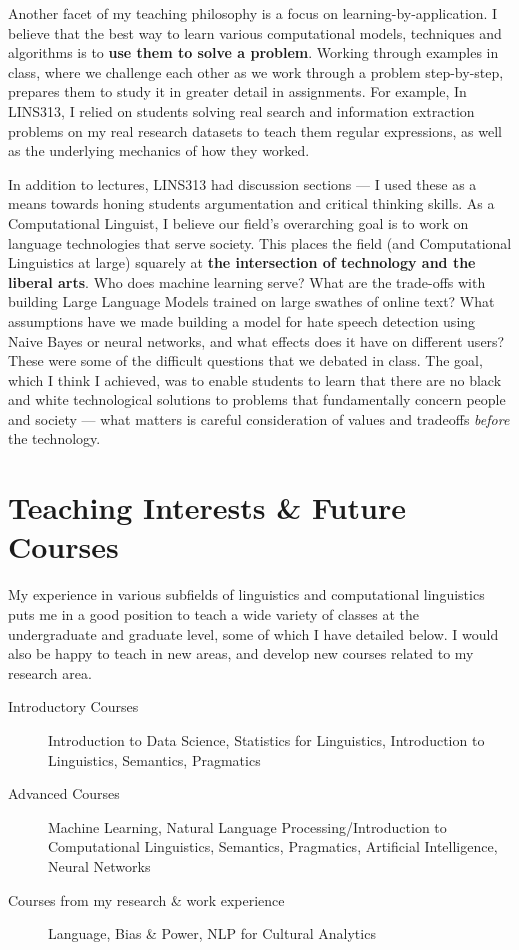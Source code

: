 \documentclass[11pt, letterpaper]{practical-report}
\begin{document}
Another facet of my teaching philosophy is a focus on learning-by-application. I believe that the best way to learn various computational models, techniques and algorithms is to \textbf{use them to solve a problem}. Working through examples in class, where we challenge each other as we work through a problem step-by-step, prepares them to study it in greater detail in assignments. For example, In {\rmcs LINS313}, I relied on students solving real search and information extraction problems on my real research datasets to teach them regular expressions, as well as the underlying mechanics of how they worked.

In addition to lectures, {\rmcs LINS313} had discussion sections --- I used these as a means towards honing students argumentation and critical thinking skills. As a Computational Linguist, I believe our field's overarching goal is to work on language technologies that serve society. This places the field (and Computational Linguistics at large) squarely at \textbf{the intersection of technology and the liberal arts}. Who does machine learning serve? What are the trade-offs with building Large Language Models trained on large swathes of online text? What assumptions have we made building a model for hate speech detection using Naive Bayes or neural networks, and what effects does it have on different users? These were some of the difficult questions that we debated in class. The goal, which I think I achieved, was to enable students to learn that there are no black and white technological solutions to problems that fundamentally concern people and society --- what matters is careful consideration of values and tradeoffs \emph{before} the technology. 

\section*{Teaching Interests \& Future Courses}

My experience in various subfields of linguistics and computational linguistics puts me in a good position to teach a wide variety of classes at the undergraduate and graduate level, some of which I have detailed below. I would also be happy to teach in new areas, and develop new courses related to my research area.

\begin{description}
    \item[Introductory Courses] Introduction to Data Science, Statistics for Linguistics, Introduction to Linguistics, Semantics, Pragmatics
    \item[Advanced Courses] Machine Learning, Natural Language Processing/Introduction to Computational Linguistics, Semantics, Pragmatics, Artificial Intelligence, Neural Networks
    \item[Courses from my research \& work experience] Language, Bias \& Power, NLP for Cultural Analytics
\end{description}
\end{document}
